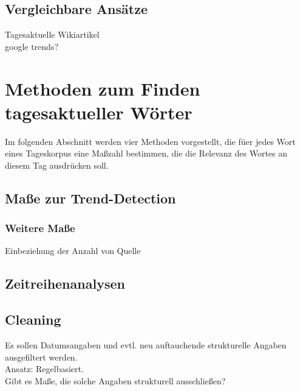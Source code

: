 \section{Vergleichbare Ansätze}
Tagesaktuelle Wikiartikel\\
google trends?\\



\chapter{Methoden zum Finden tagesaktueller Wörter}
Im folgenden Abschnitt werden vier Methoden vorgestellt, die f\"uer jedes Wort eines Tageskorpus eine Ma\ss zahl bestimmen, die die Relevanz des Wortes an diesem Tag ausdr\"ucken soll.

\section{Maße zur Trend-Detection}





\subsection{Weitere Maße}
Einbeziehung der Anzahl von Quelle

\section{Zeitreihenanalysen}

\section{Cleaning}
Es sollen Datumsangaben und evtl. neu auftauchende strukturelle Angaben ausgefiltert werden.\\
Ansatz: Regelbasiert.\\
Gibt es Maße, die solche Angaben strukturell ausschließen?



